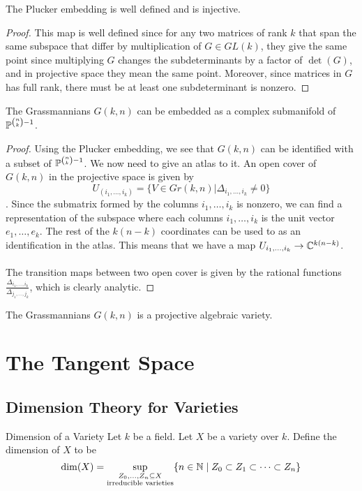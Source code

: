 \documentclass[a4paper]{article}
\begin{document}
\begin{prp}{}{} The Plucker embedding is well defined and is injective. \tcbline
\begin{proof}
This map is well defined since for any two matrices of rank $k$ that span the same subspace that differ by multiplication of $G\in GL(k)$, they give the same point since multiplying $G$ changes the subdeterminants by a factor of $\det(G)$, and in projective space they mean the same point. Moreover, since matrices in $G$ has full rank, there must be at least one subdeterminant is nonzero. 
\end{proof}
\end{prp}

\begin{thm}{}{} The Grassmannians $G(k,n)$ can be embedded as a complex submanifold of $\mathbb{P}^{\binom{n}{k}-1}$. \tcbline
\begin{proof}
Using the Plucker embedding, we see that $G(k,n)$ can be identified with a subset of $\mathbb{P}^{\binom{n}{k}-1}$. We now need to give an atlas to it. An open cover of $G(k,n)$ in the projective space is given by $$U_{(i_1,\dots,i_k)}=\{V\in Gr(k,n)|\Delta_{i_1,\dots,i_k}\neq 0\}$$. Since the submatrix formed by the columns $i_1,\dots,i_k$ is nonzero, we can find a representation of the subspace where each columns $i_1,\dots,i_k$ is the unit vector $e_1,\dots,e_k$. The rest of the $k(n-k)$ coordinates can be used to as an identification in the atlas. This means that we have a map $U_{i_1,\dots,i_k}\to\mathbb{C}^{k(n-k)}$. \\~\\
The transition maps between two open cover is given by the rational functions $\frac{\Delta_{i_1,\dots,i_k}}{\Delta_{j_1,\dots,j_k}}$, which is clearly analytic. 
\end{proof}
\end{thm}

\begin{thm}{}{} The Grassmannians $G(k,n)$ is a projective algebraic variety. 
\end{thm}

\pagebreak
\section{The Tangent Space}
\subsection{Dimension Theory for Varieties}
\begin{defn}{Dimension of a Variety}{} Let $k$ be a field. Let $X$ be a variety over $k$. Define the dimension of $X$ to be $$\dim(X)=\sup_{\substack{Z_0,\dots,Z_n\subseteq X\\\text{irreducible varieties}}}\{n\in\mathbb{N}\;|\;Z_0\subset Z_1\subset\dots\subset Z_n\}$$
\end{defn}
\end{document}
